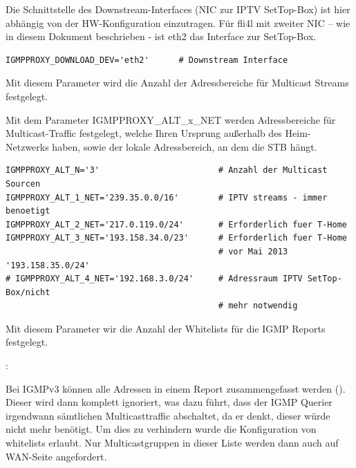 \begin{description}

Die Schnittstelle des Downstream-Interfaces (NIC zur IPTV SetTop-Box) ist hier
abhängig von der HW-Konfiguration einzutragen. Für fli4l mit zweiter NIC – wie
in diesem Dokument beschrieben - ist eth2 das Interface zur SetTop-Box.

\begin{example}
\begin{verbatim}
IGMPPROXY_DOWNLOAD_DEV='eth2'      # Downstream Interface
\end{verbatim}
\end{example}


Mit diesem Parameter wird die Anzahl der Adressbereiche für Multicast Streams
festgelegt.


Mit dem Parameter IGMPPROXY\_ALT\_x\_NET werden Adressbereiche für
Multicast-Traffic festgelegt, welche Ihren Ursprung außerhalb des Heim-Netzwerks
haben, sowie der lokale Adressbereich, an dem die STB hängt.

\begin{example}
\begin{verbatim}
IGMPPROXY_ALT_N='3'                        # Anzahl der Multicast Sourcen
IGMPPROXY_ALT_1_NET='239.35.0.0/16'        # IPTV streams - immer benoetigt
IGMPPROXY_ALT_2_NET='217.0.119.0/24'       # Erforderlich fuer T-Home
IGMPPROXY_ALT_3_NET='193.158.34.0/23'      # Erforderlich fuer T-Home
                                           # vor Mai 2013 '193.158.35.0/24'
# IGMPPROXY_ALT_4_NET='192.168.3.0/24'     # Adressraum IPTV SetTop-Box/nicht
                                           # mehr notwendig
\end{verbatim}
\end{example}


Mit diesem Parameter wir die Anzahl der Whitelists für die IGMP Reports
festgelegt.

:\newline

Bei IGMPv3 können alle Adressen in einem Report zusammengefasst werden
().
Dieser wird dann komplett ignoriert, was dazu führt, dass der IGMP Querier
irgendwann sämtlichen Multicasttraffic abschaltet, da er denkt, dieser würde
nicht mehr benötigt. Um dies zu verhindern wurde die Konfiguration von
whitelists erlaubt. Nur Multicastgruppen in dieser Liste werden dann auch auf
WAN-Seite angefordert.


\end{description}

